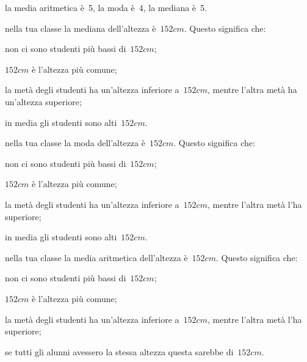 \begin{esercizio}
\begin{enumerate*}
\begin{enumeratea}
\item la media aritmetica è~5, la moda è~4, la mediana è~5.
 \end{enumeratea}
\item nella tua classe la mediana dell'altezza è~$152\unit{cm}$. Questo significa che:
 \begin{enumeratea}
\item non ci sono studenti più bassi di~$152\unit{cm}$;
\item $152\unit{cm}$ è l'altezza più comune;
\item la metà degli studenti ha un'altezza inferiore a~$152\unit{cm}$, mentre l'altra metà ha un'altezza superiore;
\item in media gli studenti sono alti~$152\unit{cm}$.
 \end{enumeratea}
\item nella tua classe la moda dell'altezza è~$152\unit{cm}$. Questo significa che:
 \begin{enumeratea}
\item non ci sono studenti più bassi di~$152\unit{cm}$;
\item $152\unit{cm}$ è l'altezza più comune;
\item la metà degli studenti ha un'altezza inferiore a~$152\unit{cm}$, mentre l'altra metà l'ha superiore;
\item in media gli studenti sono alti~$152\unit{cm}$.
 \end{enumeratea}
\item nella tua classe la media aritmetica dell'altezza è~$152\unit{cm}$. Questo significa che:
 \begin{enumeratea}
\item non ci sono studenti più bassi di~$152\unit{cm}$;
\item $152\unit{cm}$ è l'altezza più comune;
\item la metà degli studenti ha un'altezza inferiore a~$152\unit{cm}$, mentre l'altra metà l'ha superiore;
\item se tutti gli alunni avessero la stessa altezza questa sarebbe di~$152\unit{cm}$.
 \end{enumeratea}

\end{enumerate*}
\end{esercizio}
\pagebreak

